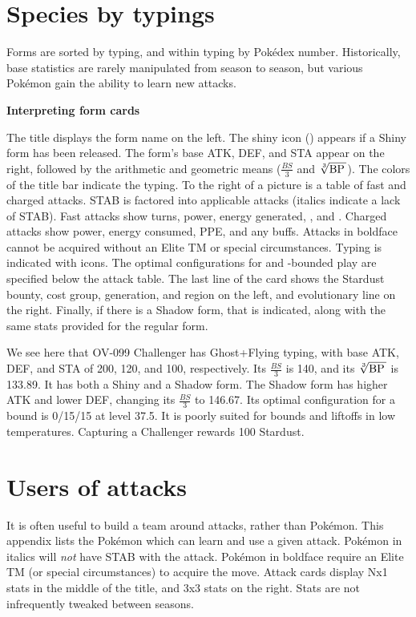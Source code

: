 \chapter{Species by typings\label{chap:speciesbytype}}
Forms are sorted by typing, and within typing by Pokédex number.
Historically, base statistics are rarely manipulated from season to season, but
 various Pokémon gain the ability to learn new attacks.
\vfill
\begin{center}\textbf{Interpreting form cards}\end{center}

The title displays the form name on the left.
The shiny icon () appears
 if a Shiny form has been released.
The form's base ATK, DEF, and STA appear on the right, followed by the arithmetic and geometric means
 ($\frac{BS}{3}$ and $\sqrt[3]{\mbox{BP}\,}$).
The colors of the title bar indicate the typing.
To the right of a picture is a table of fast and charged attacks.
STAB is factored into applicable attacks (italics indicate a lack of STAB).
Fast attacks show turns, power, energy generated, \PPT{}, and \EPT{}\@.
Charged attacks show power, energy consumed, PPE, and any buffs.
Attacks in boldface cannot be acquired without an Elite TM or special circumstances.
Typing is indicated with icons.
The optimal configurations for  and -bounded play are specified below the attack table.
The last line of the card shows the Stardust bounty, cost group, generation, and region on the left,
 and evolutionary line on the right.
Finally, if there is a Shadow form, that is indicated, along with the same stats
  provided for the regular form.
\vfill

\bigskip\noindent{}We see here that OV-099 Challenger has Ghost+Flying typing, with base ATK, DEF, and STA
of 200, 120, and 100, respectively. Its $\frac{BS}{3}$ is 140, and its $\sqrt[3]{\mbox{BP}\,}$ is 133.89.
It has both a Shiny and a Shadow form. The Shadow form has higher ATK and lower DEF, changing
its $\frac{BS}{3}$ to 146.67. Its optimal configuration for a  bound is 0/15/15 at level 37.5.
It is poorly suited for  bounds and liftoffs in low temperatures.
Capturing a Challenger rewards 100 Stardust.
\clearpage

\chapter{Users of attacks\label{chap:attackemployers}}
It is often useful to build a team around attacks, rather than Pokémon.
This appendix lists the Pokémon which can learn and use a given attack.
Pokémon in italics will \textit{not} have STAB with the attack.
Pokémon in boldface require an Elite TM (or special circumstances) to acquire the move.
Attack cards display Nx1 stats in the middle of the title, and 3x3 stats on the right.
Stats are not infrequently tweaked between seasons.
